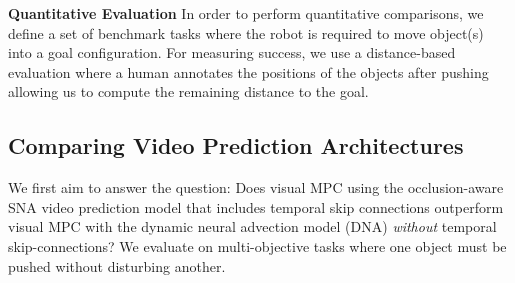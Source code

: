 \noindent \textbf{Quantitative Evaluation} In order to perform quantitative comparisons, we define a set of benchmark tasks where the robot is required to move object(s) into a goal configuration. For measuring success, we use a distance-based evaluation where a human annotates the positions of the objects after pushing allowing us to compute the remaining distance to the goal.

\subsection{Comparing Video Prediction Architectures}
\label{subsec:sna_experiments}
We first aim to answer the question: Does  visual MPC using the occlusion-aware SNA video prediction model that includes temporal skip connections outperform visual MPC with the dynamic neural advection model (DNA)\cite{foresight} \emph{without} temporal skip-connections?
We evaluate on multi-objective tasks where one object must be pushed without disturbing another.

	
